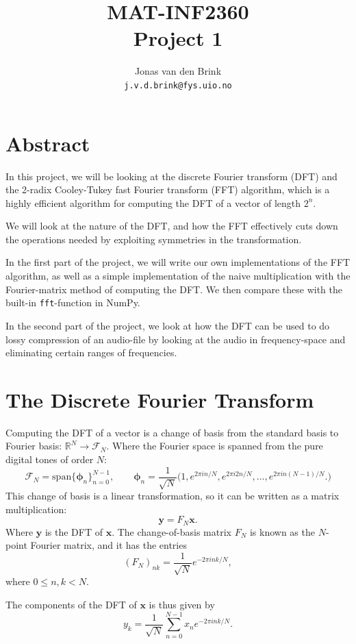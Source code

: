 \documentclass[a4paper, 11pt, notitlepage, english]{article}
\author{Jonas van den Brink \\ \texttt{j.v.d.brink@fys.uio.no}}
\title{MAT-INF2360 \\ Project 1}
\newcommand{\bt}[1]{\boldsymbol{#1}}
\begin{document}
\vspace {2cm}
\maketitle
\vspace {2 cm}
\section*{Abstract}
In this project, we will be looking at the discrete Fourier transform (DFT) and the 2-radix Cooley-Tukey fast Fourier transform (FFT) algorithm, which is a highly efficient algorithm for computing the DFT of a vector of length $2^n$.

We will look at the nature of the DFT, and how the FFT effectively cuts down the operations needed by exploiting symmetries in the transformation. 

In the first part of the project, we will write our own implementations of the FFT algorithm, as well as a simple implementation of the naive multiplication with the Fourier-matrix method of computing the DFT. We then compare these with the built-in \verb+fft+-function in NumPy.

In the second part of the project, we look at how the DFT can be used to do lossy compression of an audio-file by looking at the audio in frequency-space and eliminating certain ranges of frequencies.

\clearpage

\section*{The Discrete Fourier Transform}
Computing the DFT of a vector is a change of basis from the standard basis to Fourier basis: $\mathbb{R}^N \to \mathcal{F}_N$. Where the Fourier space is spanned from the pure digital tones of order $N$:
$$\mathcal{F}_N = \mbox{span}\big\{\bt{\phi}_n\big\}_{n=0}^{N-1}, \qquad \bt{\phi}_n = \frac{1}{\sqrt{N}}\big(1, e^{2\pi i n/N}, e^{2\pi i 2n/N}, \ldots, e^{2\pi i n(N-1)/N}.)$$
This change of basis is a linear transformation, so it can be written as a matrix multiplication:
$$\bt{y} = F_N \bt{x}.$$
Where $\bt{y}$ is the DFT of $\bt{x}$. The change-of-basis matrix $F_N$ is known as the $N$-point Fourier matrix, and it has the entries
$$(F_N)_{nk} = \frac{1}{\sqrt{N}}e^{-2\pi i n k/N},$$
where $0\leq n,k < N$.

The components of the DFT of $\bt{x}$ is thus given by
$$y_k = \frac{1}{\sqrt{N}}\sum_{n=0}^{N-1} x_n e^{-2\pi i nk /N}.$$
\end{document}
